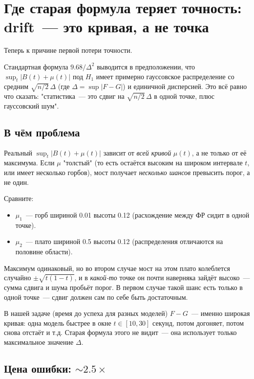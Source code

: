 \documentclass[11pt]{article}
\begin{document}
\section{Где старая формула теряет точность: drift~--- это кривая, а не точка}

Теперь к причине первой потери точности.

Стандартная формула $9.68/\Delta^2$ выводится в предположении, что $\sup_t |B(t) + \mu(t)|$ под $H_1$ имеет примерно гауссовское распределение со средним $\sqrt{n/2}\,\Delta$ (где $\Delta = \sup |F-G|$) и единичной дисперсией. Это всё равно что сказать: "статистика~--- это сдвиг на $\sqrt{n/2}\,\Delta$ в одной точке, плюс гауссовский шум".

\subsection{В чём проблема}

Реальный $\sup_t |B(t) + \mu(t)|$ зависит от \emph{всей кривой} $\mu(t)$, а не только от её максимума. Если $\mu$ "толстый" (то есть остаётся высоким на широком интервале $t$, или имеет несколько горбов), мост получает \emph{несколько шансов} превысить порог, а не один.

\begin{intuition}
Сравните:
\begin{itemize}[leftmargin=2em, itemsep=1pt]
\item $\mu_1$~--- горб шириной 0.01 высоты 0.12 (расхождение между ФР сидит в одной точке).
\item $\mu_2$~--- плато шириной 0.5 высоты 0.12 (распределения отличаются на половине области).
\end{itemize}
Максимум одинаковый, но во втором случае мост на этом плато колеблется случайно $\pm \sqrt{t(1-t)}$, и в \emph{какой-то} точке он почти наверняка зайдёт высоко~--- сумма сдвига и шума пробьёт порог. В первом случае такой шанс есть только в одной точке~--- сдвиг должен сам по себе быть достаточным.
\end{intuition}

В нашей задаче (время до успеха для разных моделей) $F-G$~--- именно широкая кривая: одна модель быстрее в окне $t \in [10, 30]$ секунд, потом догоняет, потом снова отстаёт и т.д. Старая формула этого не видит~--- она использует только максимальное значение $\Delta$.

\subsection{Цена ошибки: $\sim 2.5\times$}
\end{document}
